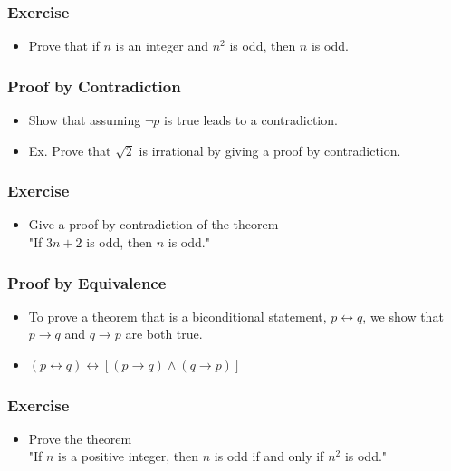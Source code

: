 \documentclass{beamer}
\begin{document}
 

\begin{frame}
\frametitle{\HandRightUp Exercise}
\begin{itemize} 
\Large
\item <1-> Prove that if $n$ is an integer and $n^2$ is odd, then $n$ is odd.  
\end{itemize}
\end{frame}  




  
\begin{frame}
\frametitle{Proof by Contradiction}
\begin{itemize} 
\Large
\item <1->  Show that assuming $\neg p$ is true leads to a contradiction.
\item <2-> Ex. Prove that $\sqrt{2}$ is irrational by giving a proof by contradiction. 
\end{itemize}
\end{frame}  
 

\begin{frame}
\frametitle{\HandRightUp Exercise}
\begin{itemize} 
\Large
\item <1-> Give a proof by contradiction of the theorem \\
 "If $3n + 2$ is odd, then $n$ is odd."
\end{itemize}
\end{frame}  


\begin{frame}
\frametitle{Proof by Equivalence}
\begin{itemize} 
\Large
\item <1->  To prove a theorem that is a biconditional statement, $p \leftrightarrow q$, we show that $p \to q$ and $q \to p$  are both true.
\item <2-> $\left( {p \leftrightarrow q} \right) \leftrightarrow \left[ {\left( {p \to q} \right) \wedge \left( {q \to p} \right)} \right]$
\end{itemize}
\end{frame}  




\begin{frame}
\frametitle{\HandRightUp Exercise}
\begin{itemize} 
\Large
\item <1-> Prove the theorem \\ "If $n$ is a positive integer, then $n$ is odd if and only if $n^2$ is odd."  
\end{itemize}
\end{frame}  
\end{document}
